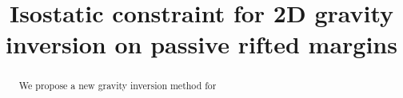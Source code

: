 \documentclass[manuscript]{geophysics}
\begin{document}
\title{Isostatic constraint for 2D gravity inversion on passive rifted margins}

\renewcommand{\thefootnote}{\fnsymbol{footnote}} 




\maketitle

\begin{abstract}

We propose a new gravity inversion method for 


\end{abstract}
\end{document}
